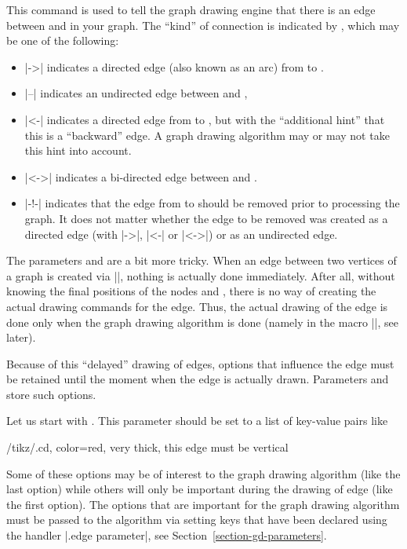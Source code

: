 \begin{command}{\pgfgdedge{}}
  This command is used to tell the graph drawing engine that there is
  an edge between  and  in your
  graph. The ``kind'' of connection is indicated by ,
  which may be one of the following:
  \begin{itemize}
  \item 
    |->| indicates a directed edge (also known as an arc) from
     to .
  \item |--| indicates an undirected edge between 
    and ,
  \item |<-| indicates a directed edge from  to
    , but with the ``additional hint'' that this is a
    ``backward'' edge. A graph drawing algorithm may  or may not take
    this hint into account.
  \item |<->| indicates a bi-directed edge between 
    and . 
  \item |-!-| indicates that the edge from  to
     should be removed prior to processing the
    graph. It does not matter whether the edge to be removed was created
    as a directed edge (with |->|, |<-| or |<->|) or as an undirected
    edge.
  \end{itemize}
  The parameters  and  are a bit
  more tricky. When an edge between two vertices of a graph is created
  via |\pgfgdedge|, nothing is actually done immediately. After all,
  without knowing the final positions of the nodes 
  and , there is no way of creating the actual
  drawing commands for the edge. Thus, the actual drawing of the edge
  is done only when the graph drawing algorithm is done (namely in the
  macro |\pgfgdedgecallback|, see later). 

  Because of this ``delayed'' drawing of edges, options that influence
  the edge must be retained until the moment when the edge is actually
  drawn. Parameters  and  store such
  options. 

  Let us start with . This parameter should be set
  to a list of key-value pairs like
\begin{codeexample}
/tikz/.cd, color=red, very thick, this edge must be vertical
\end{codeexample}
  Some of these options may be of interest to the graph drawing
  algorithm (like the last option) while others will 
  only be important during the drawing of edge (like the first
  option). The options that are important for the graph drawing
  algorithm must be passed to the algorithm via setting keys that have
  been declared using the handler |.edge parameter|, see
  Section~\ref{section-gd-parameters}. 


\end{command}
